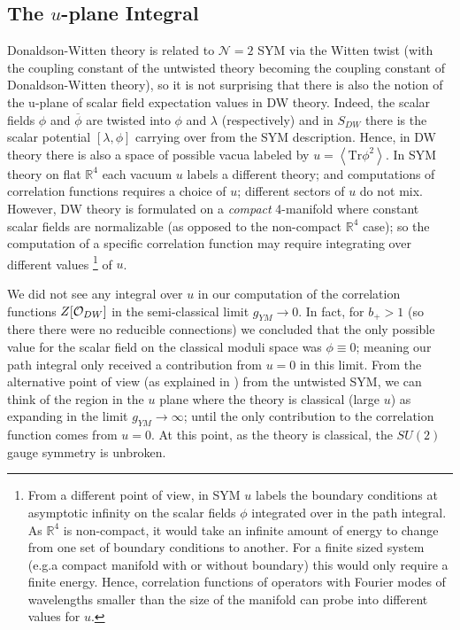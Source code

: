 \documentclass[12pt, onecolumn]{article}
\begin{document}
\subsection{The $u$-plane Integral}

Donaldson-Witten theory is related to $\mathcal{N}=2$ SYM via the Witten twist (with the coupling constant of the untwisted theory becoming the coupling constant of Donaldson-Witten theory), so it is not surprising that there is also the notion of the u-plane of scalar field expectation values in DW theory.  Indeed, the scalar fields $\phi$ and $\overline{\phi}$ are twisted into $\phi$ and $\lambda$ (respectively) and in $S_{DW}$ there is the scalar potential $[\lambda,\phi]$ carrying over from the SYM description.  Hence, in DW theory there is also a space of possible vacua labeled by $u=\left \langle \text{Tr} \phi^2 \right \rangle$.  In SYM theory on flat $\mathbb{R}^{4}$ each vacuum $u$ labels a different theory; and computations of correlation functions requires a choice of $u$; different sectors of $u$ do not mix.  However, DW theory is formulated on a \textit{compact} 4-manifold where constant scalar fields are normalizable (as opposed to the non-compact $\mathbb{R}^{4}$ case); so the computation of a specific correlation function may require integrating over different values \footnote{From a different point of view, in SYM $u$ labels the boundary conditions at asymptotic infinity on the scalar fields $\phi$ integrated over in the path integral.  As $\mathbb{R}^{4}$ is non-compact, it would take an infinite amount of energy to change from one set of boundary conditions to another.  For a finite sized system (e.g.a compact manifold with or without boundary) this would only require a finite energy.  Hence, correlation functions of operators with Fourier modes of wavelengths smaller than the size of the manifold can probe into different values for $u$.} of $u$.


\vspace{5mm}

\noindent We did not see any integral over $u$ in our computation of the correlation functions $Z[{\cal O}_{DW}]$ in the semi-classical limit $g_{YM} \rightarrow 0$.  In fact, for $b_{+}>1$ (so there there were no reducible connections) we concluded that the only possible value for the scalar field on the classical moduli space was $\phi \equiv 0$; meaning our path integral only received a contribution from $u=0$ in this limit.  From the alternative point of view (as explained in \cite{Iga}) from the untwisted SYM, we can think of the region in the $u$ plane where the theory is classical (large $u$) as expanding in the limit $g_{YM} \rightarrow \infty$; until the only contribution to the correlation function comes from $u=0$.  At this point, as the theory is classical, the $SU(2)$ gauge symmetry is unbroken.
\end{document}
